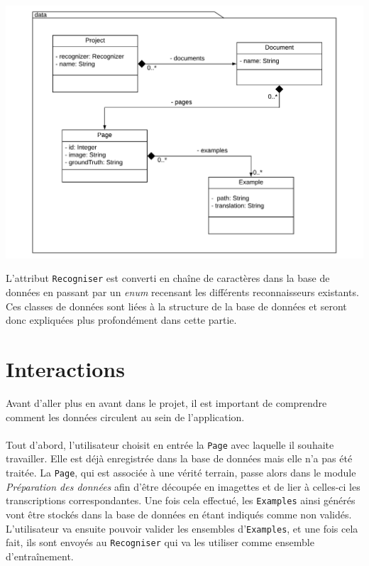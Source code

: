 \begin{mdframed}[frametitle={Figure 9 : Structure du package de données}, innerbottommargin=10]
\begin{center}
\includegraphics[scale=0.4]{assets/UML_data.pdf}
\end{center}
\end{mdframed}

L'attribut \texttt{Recogniser} est converti en chaîne de caractères dans la base de données en passant par un \textit{enum} recensant les différents reconnaisseurs existants. Ces classes de données sont liées à la structure de la base de données et seront donc expliquées plus profondément dans cette partie.

\section{Interactions}

Avant d'aller plus en avant dans le projet, il est important de comprendre comment les données circulent au sein de l'application. 

\paragraph{}
Tout d'abord, l'utilisateur choisit en entrée la \texttt{Page} avec laquelle il souhaite travailler. Elle est déjà enregistrée dans la base de données mais elle n'a pas été traitée. La \texttt{Page}, qui est associée à une vérité terrain, passe alors dans le module \textit{Préparation des données} afin d'être découpée en imagettes et de lier à celles-ci les transcriptions correspondantes. Une fois cela effectué, les \texttt{Examples} ainsi générés vont être stockés dans la base de données en étant indiqués comme non validés. L'utilisateur va ensuite pouvoir valider les ensembles d'\texttt{Examples}, et une fois cela fait, ils sont envoyés au \texttt{Recogniser} qui va les utiliser comme ensemble d'entraînement.

